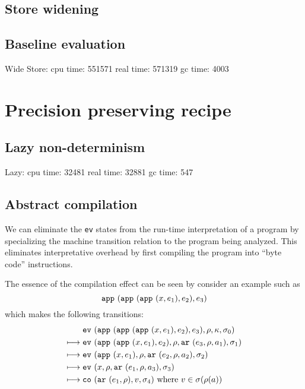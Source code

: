 \documentclass{llncs}
\begin{document}
\subsection{Store widening}

\subsection{Baseline evaluation}

Wide Store: cpu time: 551571 real time: 571319 gc time: 4003

\section{Precision preserving recipe}

\subsection{Lazy non-determinism}

Lazy:
   cpu time: 32481 real time: 32881 gc time: 547

\subsection{Abstract compilation}

We can eliminate the {\tt ev} states from the run-time interpretation
of a program by specializing the machine transition relation to the
program being analyzed.  This eliminates interpretative overhead by
first compiling the program into ``byte code'' instructions.

The essence of the compilation effect can be seen by consider an example
such as
\[
{\tt app\ }({{\tt app\ }({{\tt app\ }({x,e_1}),e_2}),e_3})
\]
which makes the following transitions:
\begin{align}
& \ev{\sapp{\sapp{\sapp\mvar{\mexp_1}}{\mexp_2}}{\mexp_3},\menv,\mkont,\msto_0}\\
\machstep\; &
\ev{\sapp{\sapp\mvar{\mexp_1}}{\mexp_2},\menv,\kar{\mexp_3,\menv,\maddr_1},\msto_1}
\\
\machstep\; &
\ev{\sapp\mvar{\mexp_1},\menv,\kar{\mexp_2,\menv,\maddr_2},\msto_2}
\\
\machstep\; &
\ev{\mvar, \menv,\kar{\mexp_1,\menv,\maddr_3},\msto_3} %
\\
\machstep\; &
\co{\kar{\mexp_1,\menv},\mval,\msto_4} %
\mbox{ where } \mval \in \msto(\menv(\maddr))
\end{align}
\end{document}
